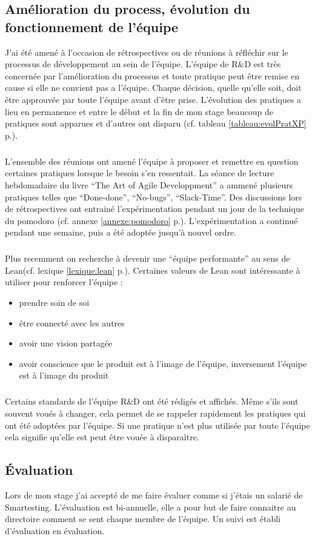 \subsection{Amélioration du process, évolution du fonctionnement de l'équipe}
J'ai été amené à l'occasion de rétrospectives ou de réunions à réfléchir sur le processus de développement au sein de l'équipe. L'équipe de R\&D est très concernée par l'amélioration du processus et toute pratique peut être remise en cause si elle ne convient pas a l'équipe. Chaque décision, quelle qu'elle soit, doit être approuvée par toute l'équipe avant d'être prise. L'évolution des pratiques a lieu en permanence et entre le début et la fin de mon stage beaucoup de pratiques sont apparues et d'autres ont disparu (cf. tableau \ref{tableau:evolPratXP} p.\pageref{tableau:evolPratXP}).
\subparagraph*{}
L'ensemble des réunions ont amené l'équipe à proposer et remettre en question certaines pratiques lorsque le besoin s'en ressentait. La séance de lecture hebdomadaire du livre ``The Art of Agile Developpment'' a ammené plusieurs pratiques telles que ``Done-done'', ``No-bugs'', ``Slack-Time''. Des discussions lors de rétrospectives ont entrainé l'expérimentation pendant un jour de la technique du pomodoro (cf. annexe \ref{annexe:pomodoro} p.\pageref{annexe:pomodoro}). L'expérimentation a continué pendant une semaine, puis a été adoptée jusqu'à nouvel ordre.

\subparagraph*{}
Plus recemment on recherche à devenir une ``équipe performante'' au sens de Lean(cf. lexique \ref{lexique:lean} p.\pageref{lexique:lean}). Certaines valeurs de Lean sont intéressante à utiliser pour renforcer l'équipe :
\begin{itemize}
\item prendre soin de soi
\item être connecté avec les autres
\item avoir une vision partagée
\item avoir conscience que le produit est à l'image de l'équipe, inversement l'équipe est à l'image du produit
\end{itemize}
\subparagraph*{}
Certains standards de l'équipe R\&D ont été rédigés et affichés. Même s'ils sont souvent voués à changer, cela permet de se rappeler rapidement les pratiques qui ont été adoptées par l'équipe. Si une pratique n'est plus utilisée par toute l'équipe cela signifie qu'elle est peut être vouée à disparaître.
\subsection{Évaluation}
Lors de mon stage j'ai accepté de me faire évaluer comme si j'étais un salarié de Smartesting. L'évaluation est bi-annuelle, elle a pour but de faire connaitre au directoire comment se sent chaque membre de l'équipe. Un suivi est établi d'évaluation en évaluation.